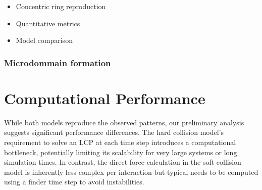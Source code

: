 \documentclass[conference]{IEEEtran}
\newlength{\subfigwidth}
\newcommand{\growthcomparisonrow}[6]{%
    #1 &
    \begin{subfigure}[b]{\subfigwidth}
        \texttt{[image: figures/growth\_comparison\_lambda\_\#2/\#1.\#3.png]}
    \end{subfigure} &
    \begin{subfigure}[b]{\subfigwidth}
        \texttt{[image: figures/growth\_comparison\_lambda\_\#2/\#1.\#4.png]}
    \end{subfigure} &
    \begin{subfigure}[b]{\subfigwidth}
        \texttt{[image: figures/growth\_comparison\_lambda\_\#2/\#1.\#5.png]}
    \end{subfigure} &
    \begin{subfigure}[b]{\subfigwidth}
        \texttt{[image: figures/growth\_comparison\_lambda\_\#2/\#1.\#6.png]}
    \end{subfigure}  \\
}
\begin{document}





\begin{itemize}
    \item Concentric ring reproduction
    \item Quantitative metrics
    \item Model comparison
\end{itemize}



\subsubsection{Microdommain formation}

\cite{You2018}





\newpage

\section{Computational Performance}

While both models reproduce the observed patterns, our preliminary analysis suggests significant performance differences. The hard collision model's requirement to solve an LCP at each time step introduces a computational bottleneck, potentially limiting its scalability for very large systems or long simulation times. In contrast, the direct force calculation in the soft collision model is inherently less complex per interaction but typical needs to be computed using a finder time step to avoid instabilities.
\end{document}
